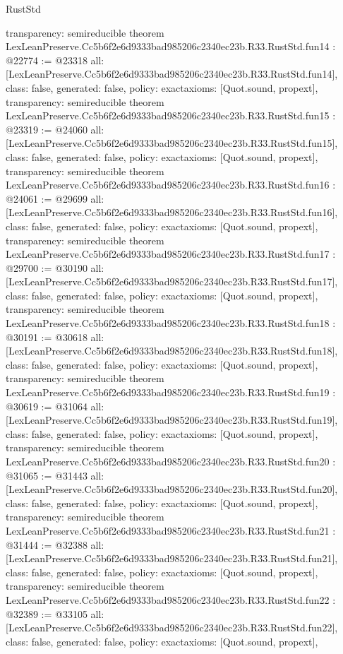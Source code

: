 \begin{lexlean}{RustStd}
\begin{coremodule}
{  transparency: semireducible
}
theorem LexLeanPreserve.Cc5b6f2e6d9333bad985206c2340ec23b.R33.RustStd.fun14 : @22774 := @23318 {
  all: [LexLeanPreserve.Cc5b6f2e6d9333bad985206c2340ec23b.R33.RustStd.fun14],
  class: false,
  generated: false,
  policy: exact{axioms: [Quot.sound, propext]},
  transparency: semireducible
}
theorem LexLeanPreserve.Cc5b6f2e6d9333bad985206c2340ec23b.R33.RustStd.fun15 : @23319 := @24060 {
  all: [LexLeanPreserve.Cc5b6f2e6d9333bad985206c2340ec23b.R33.RustStd.fun15],
  class: false,
  generated: false,
  policy: exact{axioms: [Quot.sound, propext]},
  transparency: semireducible
}
theorem LexLeanPreserve.Cc5b6f2e6d9333bad985206c2340ec23b.R33.RustStd.fun16 : @24061 := @29699 {
  all: [LexLeanPreserve.Cc5b6f2e6d9333bad985206c2340ec23b.R33.RustStd.fun16],
  class: false,
  generated: false,
  policy: exact{axioms: [Quot.sound, propext]},
  transparency: semireducible
}
theorem LexLeanPreserve.Cc5b6f2e6d9333bad985206c2340ec23b.R33.RustStd.fun17 : @29700 := @30190 {
  all: [LexLeanPreserve.Cc5b6f2e6d9333bad985206c2340ec23b.R33.RustStd.fun17],
  class: false,
  generated: false,
  policy: exact{axioms: [Quot.sound, propext]},
  transparency: semireducible
}
theorem LexLeanPreserve.Cc5b6f2e6d9333bad985206c2340ec23b.R33.RustStd.fun18 : @30191 := @30618 {
  all: [LexLeanPreserve.Cc5b6f2e6d9333bad985206c2340ec23b.R33.RustStd.fun18],
  class: false,
  generated: false,
  policy: exact{axioms: [Quot.sound, propext]},
  transparency: semireducible
}
theorem LexLeanPreserve.Cc5b6f2e6d9333bad985206c2340ec23b.R33.RustStd.fun19 : @30619 := @31064 {
  all: [LexLeanPreserve.Cc5b6f2e6d9333bad985206c2340ec23b.R33.RustStd.fun19],
  class: false,
  generated: false,
  policy: exact{axioms: [Quot.sound, propext]},
  transparency: semireducible
}
theorem LexLeanPreserve.Cc5b6f2e6d9333bad985206c2340ec23b.R33.RustStd.fun20 : @31065 := @31443 {
  all: [LexLeanPreserve.Cc5b6f2e6d9333bad985206c2340ec23b.R33.RustStd.fun20],
  class: false,
  generated: false,
  policy: exact{axioms: [Quot.sound, propext]},
  transparency: semireducible
}
theorem LexLeanPreserve.Cc5b6f2e6d9333bad985206c2340ec23b.R33.RustStd.fun21 : @31444 := @32388 {
  all: [LexLeanPreserve.Cc5b6f2e6d9333bad985206c2340ec23b.R33.RustStd.fun21],
  class: false,
  generated: false,
  policy: exact{axioms: [Quot.sound, propext]},
  transparency: semireducible
}
theorem LexLeanPreserve.Cc5b6f2e6d9333bad985206c2340ec23b.R33.RustStd.fun22 : @32389 := @33105 {
  all: [LexLeanPreserve.Cc5b6f2e6d9333bad985206c2340ec23b.R33.RustStd.fun22],
  class: false,
  generated: false,
  policy: exact{axioms: [Quot.sound, propext]},
}
\end{coremodule}
\end{lexlean}
